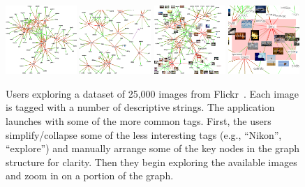 \documentclass[runningheads,a4paper]{llncs}
\begin{document}
\begin{figure}[t]
 \centering
  \includegraphics[width=0.24\textwidth]{images/graph_interaction_A_smaller.png}\hfill%
  \includegraphics[width=0.24\textwidth]{images/graph_interaction_B_smaller.png}\hfill%
  \includegraphics[width=0.24\textwidth]{images/graph_interaction_C_smaller.png}\hfill%
  \includegraphics[width=0.24\textwidth]{images/graph_interaction_D_smaller.png}%
\vspace{-0.1in}
 \caption{\label{figure:graph_interaction} Users exploring a dataset
   of 25,000 images from Flickr~\cite{MIRFLICKR}.  Each image is
   tagged with a number of descriptive strings.  The application
   launches with some of the more common tags.  First, the users
   simplify/collapse some of the less interesting tags (e.g.,
   ``Nikon'', ``explore'') and manually arrange some of the key nodes
   in the graph structure for clarity.  Then they begin exploring the
   available images and zoom in on a portion of the graph.
\vspace{-0.1in}
}
\end{figure}
\end{document}

